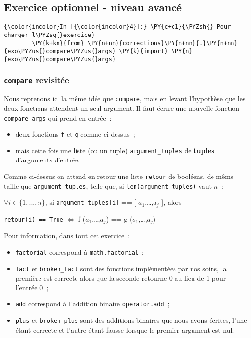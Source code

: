     \hypertarget{exercice-optionnel---niveau-avancuxe9}{%
\subsection{Exercice optionnel - niveau
avancé}\label{exercice-optionnel---niveau-avancuxe9}}

    \begin{Verbatim}[commandchars=\\\{\}]
{\color{incolor}In [{\color{incolor}4}]:} \PY{c+c1}{\PYZsh{} Pour charger l\PYZsq{}exercice}
        \PY{k+kn}{from} \PY{n+nn}{corrections}\PY{n+nn}{.}\PY{n+nn}{exo\PYZus{}compare\PYZus{}args} \PY{k}{import} \PY{n}{exo\PYZus{}compare\PYZus{}args}
\end{Verbatim}


    \hypertarget{compare-revisituxe9e}{%
\subsubsection{\texorpdfstring{\texttt{compare}
revisitée}{compare revisitée}}\label{compare-revisituxe9e}}

    Nous reprenons ici la même idée que \texttt{compare}, mais en levant
l'hypothèse que les deux fonctions attendent un seul argument. Il faut
écrire une nouvelle fonction \texttt{compare\_args} qui prend en
entrée~:

\begin{itemize}
\tightlist
\item
  deux fonctions \texttt{f} et \texttt{g} comme ci-dessus~;
\item
  mais cette fois une liste (ou un tuple) \texttt{argument\_tuples} de
  \textbf{tuples} d'arguments d'entrée.
\end{itemize}

Comme ci-dessus on attend en retour une liste \texttt{retour} de
booléens, de même taille que \texttt{argument\_tuples}, telle que, si
\texttt{len(argument\_tuples)} vaut \(n\)~:

\(\forall i \in \{1,...,n\}\), si \texttt{argument\_tuples{[}i{]}} ==
{[} \(a_1\),\ldots{},\(a_j\) {]}, alors

\texttt{retour(i)\ ==\ True} \(\Longleftrightarrow\) f
(\(a_1\),\ldots{},\(a_j\)) == g (\(a_1\),\ldots{},\(a_j\))

    Pour information, dans tout cet exercice~:

\begin{itemize}
\tightlist
\item
  \texttt{factorial} correspond à \texttt{math.factorial}~;
\item
  \texttt{fact} et \texttt{broken\_fact} sont des fonctions implémentées
  par nos soins, la première est correcte alors que la seconde retourne
  0 au lieu de 1 pour l'entrée 0~;
\item
  \texttt{add} correspond à l'addition binaire \texttt{operator.add}~;
\item
  \texttt{plus} et \texttt{broken\_plus} sont des additions binaires que
  nous avons écrites, l'une étant correcte et l'autre étant fausse
  lorsque le premier argument est nul.
\end{itemize}


